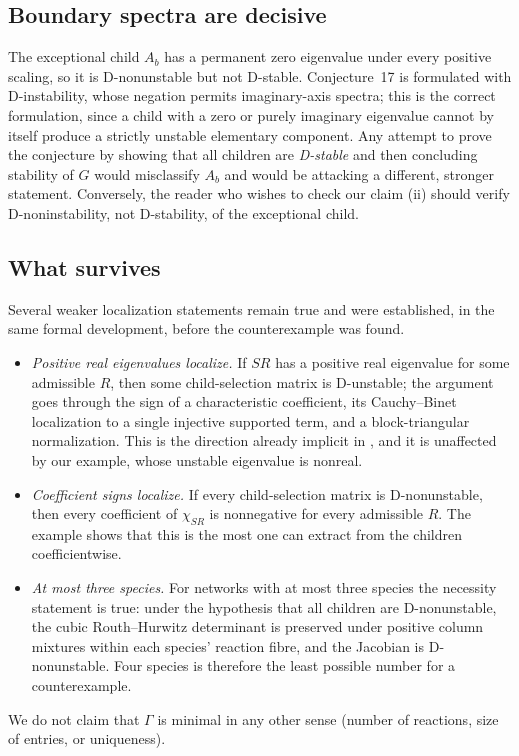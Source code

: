 \documentclass[11pt,a4paper]{article}
\theoremstyle{definition}
\theoremstyle{remark}
\begin{document}
\subsection{Boundary spectra are decisive}

The exceptional child $A_b$ has a permanent zero eigenvalue under every positive scaling, so it is D-nonunstable but not D-stable. Conjecture~17 is formulated with D-instability, whose negation permits imaginary-axis spectra; this is the correct formulation, since a child with a zero or purely imaginary eigenvalue cannot by itself produce a strictly unstable elementary component. Any attempt to prove the conjecture by showing that all children are \emph{D-stable} and then concluding stability of $G$ would misclassify $A_b$ and would be attacking a different, stronger statement. Conversely, the reader who wishes to check our claim (ii) should verify D-noninstability, not D-stability, of the exceptional child.

\subsection{What survives}

Several weaker localization statements remain true and were established, in the same formal development, before the counterexample was found.
\begin{itemize}
\item \emph{Positive real eigenvalues localize.} If $SR$ has a positive real eigenvalue for some admissible $R$, then some child-selection matrix is D-unstable; the argument goes through the sign of a characteristic coefficient, its Cauchy--Binet localization to a single injective supported term, and a block-triangular normalization. This is the direction already implicit in \cite{Vassena2023Symbolic}, and it is unaffected by our example, whose unstable eigenvalue is nonreal.
\item \emph{Coefficient signs localize.} If every child-selection matrix is D-nonunstable, then every coefficient of $\chi_{SR}$ is nonnegative for every admissible $R$. The example shows that this is the most one can extract from the children coefficientwise.
\item \emph{At most three species.} For networks with at most three species the necessity statement is true: under the hypothesis that all children are D-nonunstable, the cubic Routh--Hurwitz determinant is preserved under positive column mixtures within each species' reaction fibre, and the Jacobian is D-nonunstable. Four species is therefore the least possible number for a counterexample.
\end{itemize}
We do not claim that $\Gamma$ is minimal in any other sense (number of reactions, size of entries, or uniqueness).
\end{document}
